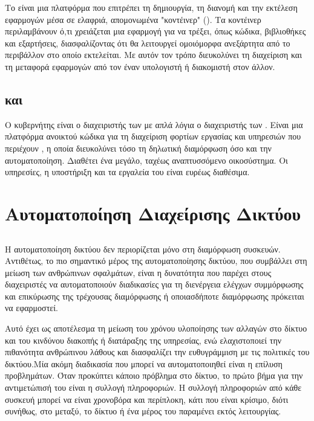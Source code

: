 Το  είναι μια πλατφόρμα που επιτρέπει τη δημιουργία, τη διανομή και την εκτέλεση εφαρμογών μέσα σε ελαφριά, απομονωμένα "κοντέινερ" (). 
Τα κοντέινερ περιλαμβάνουν ό,τι χρειάζεται μια εφαρμογή για να τρέξει, όπως κώδικα, βιβλιοθήκες και εξαρτήσεις, διασφαλίζοντας ότι θα λειτουργεί ομοιόμορφα 
ανεξάρτητα από το περιβάλλον στο οποίο εκτελείται. Με αυτόν τον τρόπο διευκολύνει τη διαχείριση και τη μεταφορά εφαρμογών από τον έναν υπολογιστή ή διακομιστή 
στον άλλον.

\subsection{ και }
Ο κυβερνήτης είναι ο διαχειριστής των με απλά λόγια ο διαχειριστής των . Είναι μια 
πλατφόρμα ανοικτού κώδικα για τη διαχείριση φορτίων εργασίας και υπηρεσιών που περιέχουν 
, η οποία διευκολύνει τόσο τη δηλωτική διαμόρφωση όσο και την αυτοματοποίηση. 
Διαθέτει ένα μεγάλο, ταχέως αναπτυσσόμενο οικοσύστημα. Οι υπηρεσίες, η υποστήριξη και τα εργαλεία του  είναι ευρέως διαθέσιμα.

\section{Αυτοματοποίηση Διαχείρισης Δικτύου}

\subsection{}

Η αυτοματοποίηση δικτύου δεν περιορίζεται μόνο στη διαμόρφωση συσκευών. 
Αντιθέτως, το πιο σημαντικό μέρος της αυτοματοποίησης δικτύου, που συμβάλλει στη μείωση των ανθρώπινων σφαλμάτων, 
είναι η δυνατότητα που παρέχει στους διαχειριστές να αυτοματοποιούν διαδικασίες για τη διενέργεια ελέγχων συμμόρφωσης και 
επικύρωσης της τρέχουσας διαμόρφωσης ή οποιασδήποτε διαμόρφωσης πρόκειται να εφαρμοστεί.

Αυτό έχει ως αποτέλεσμα τη μείωση του χρόνου υλοποίησης των αλλαγών στο δίκτυο και του κινδύνου διακοπής ή διατάραξης της υπηρεσίας, 
ενώ ελαχιστοποιεί την πιθανότητα ανθρώπινου λάθους και διασφαλίζει την ευθυγράμμιση με τις πολιτικές του δικτύου.Μία ακόμη διαδικασία που μπορεί να 
αυτοματοποιηθεί είναι η επίλυση προβλημάτων. Όταν προκύπτει κάποιο πρόβλημα στο δίκτυο, το πρώτο βήμα για την αντιμετώπισή του είναι η συλλογή πληροφοριών. 
Η συλλογή πληροφοριών από κάθε συσκευή μπορεί να είναι χρονοβόρα και περίπλοκη, κάτι που είναι κρίσιμο, διότι συνήθως, στο μεταξύ, το δίκτυο ή ένα μέρος του παραμένει 
εκτός λειτουργίας.

